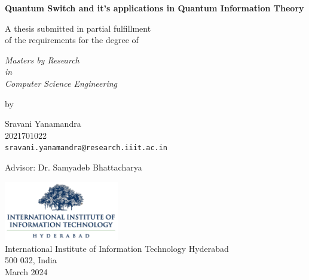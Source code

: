 \thispagestyle{empty}
\begin{center}
\vspace*{1.5cm}
{\Large \bf Quantum Switch and it's applications in Quantum Information Theory}

\vspace*{2.2cm}
{\large A thesis submitted in partial fulfillment\\}
{\large  of the requirements for the degree of \\}

\vspace*{1cm}
{\it {\large Masters by Research } \\
{\large in\\}
{\large Computer Science Engineering \\}}

\vspace*{0.8cm}
{\large by}

\vspace*{6mm}
{\large Sravani Yanamandra\\}
{\large 2021701022\\
{\small \tt sravani.yanamandra@research.iiit.ac.in}}

\vspace*{5mm}
{\large Advisor: Dr. Samyadeb Bhattacharya\\}


\vspace*{3.0cm}
{\includegraphics[width=5cm]{figures/iiit.png}\\}
{\large International Institute of Information Technology Hyderabad\\}
{\large 500 032, India\\}
\vspace*{5mm}
{\large March 2024\\}
\end{center}